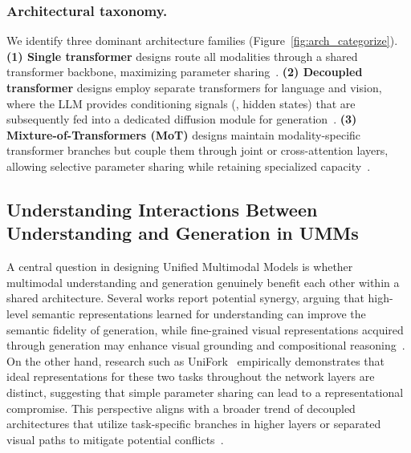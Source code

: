\vspace{-10pt}
\subsubsection{Architectural taxonomy.}
We identify three dominant architecture families (Figure~\ref{fig:arch_categorize}). \textbf{(1) Single transformer} designs route all modalities through a shared transformer backbone, maximizing parameter sharing~\cite{team2024chameleon, cui2025emu3, wang2024emu3}. \textbf{(2) Decoupled transformer} designs employ separate transformers for language and vision, where the LLM provides conditioning signals (\eg, hidden states) that are subsequently fed into a dedicated diffusion module for generation~\cite{pan2025meataquery, tong2025metamorph}. \textbf{(3) Mixture-of-Transformers (MoT)} designs maintain modality-specific transformer branches but couple them through joint or cross-attention layers, allowing selective parameter sharing while retaining specialized capacity~\cite{deng2025bagel,li2025unifork,wang2025lightfusion, wang2025hbridge}.


\subsection{Understanding Interactions Between Understanding and Generation in UMMs}
A central question in designing Unified Multimodal Models is whether multimodal understanding and generation genuinely benefit each other within a shared architecture. Several works report potential synergy, arguing that high-level semantic representations learned for understanding can improve the semantic fidelity of generation, while fine-grained visual representations acquired through generation may enhance visual grounding and compositional reasoning~\cite{wu2026liquid, xin2025lumina, yang2025mmar, wu2025harmonizing, kou2025orthus, li2025dual,zhang2025unified}. On the other hand, research such as UniFork~\cite{li2025unifork} empirically demonstrates that ideal representations for these two tasks throughout the network layers are distinct, suggesting that simple parameter sharing can lead to a representational compromise. This perspective aligns with a broader trend of decoupled architectures that utilize task-specific branches in higher layers or separated visual paths to mitigate potential conflicts~\cite{wu2025janus, chen2025januspro, deng2025bagel}. 


